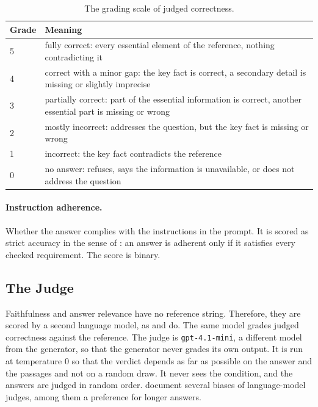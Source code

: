\documentclass[12pt,a4paper,oneside]{scrreprt}
\begin{document}
\begin{table}[htbp]
\centering
\caption{The grading scale of judged correctness.}
\label{tab:judgescale}
\begin{tabular}{l>{\raggedright\arraybackslash}p{}}
\toprule
Grade & Meaning \\
\midrule
5 & fully correct: every essential element of the reference, nothing contradicting it \\
4 & correct with a minor gap: the key fact is correct, a secondary detail is missing or slightly imprecise \\
3 & partially correct: part of the essential information is correct, another essential part is missing or wrong \\
2 & mostly incorrect: addresses the question, but the key fact is missing or wrong \\
1 & incorrect: the key fact contradicts the reference \\
0 & no answer: refuses, says the information is unavailable, or does not address the question \\
\bottomrule
\end{tabular}
\end{table}

\paragraph{Instruction adherence.} Whether the answer complies with the instructions in the prompt. It is scored as strict accuracy in the sense of \citet{zhou2023ifeval}: an answer is adherent only if it satisfies every checked requirement. The score is binary. 
\subsection{The Judge}
\label{sec:judge}

Faithfulness and answer relevance have no reference string. Therefore, they are scored by a second language model, as \citet{es2023ragas} and \citet{saadfalcon2024ares} do. The same model grades judged correctness against the reference. The judge is \texttt{gpt-4.1-mini}, a different model from the generator, so that the generator never grades its own output. It is run at temperature 0 so that the verdict depends as far as possible on the answer and the passages and not on a random draw. It never sees the condition, and the answers are judged in random order. \citet{zheng2023judge} document several biases of language-model judges, among them a preference for longer answers.
\end{document}
